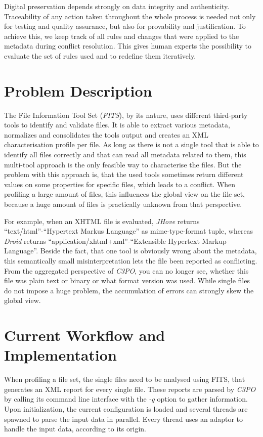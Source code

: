 \documentclass[a4paper,12pt]{article}
\begin{document}
Digital preservation depends strongly on data integrity and authenticity. Traceability of any action taken throughout the whole process is needed not only for testing and quality assurance, but also for provability and justification. To achieve this, we keep track of all rules and changes that were applied to the metadata during conflict resolution. This gives human experts the possibility to evaluate the set of rules used and to redefine them iteratively.

\clearpage

\section{Problem Description}

The File Information Tool Set (\emph{FITS}), by its nature, uses different third-party tools to identify and validate files. It is able to extract various metadata, normalizes and consolidates the tools output and creates an XML characterisation profile per file. As long as there is not a single tool that is able to identify all files correctly and that can read all metadata related to them, this multi-tool approach is the only feasible way to characterise the files. But the problem with this approach is, that the used tools sometimes return different values on some properties for specific files, which leads to a conflict. When profiling a large amount of files, this influences the global view on the file set, because a huge amount of files is practically unknown from that perspective.

For example, when an XHTML file is evaluated, \emph{JHove} returns ``text/html''-``Hypertext Markus Language'' as mime-type-format tuple, whereas \emph{Droid} returns ``application/xhtml+xml''-``Extensible Hypertext Markup Language''. Beside the fact, that one tool is obviously wrong about the metadata, this semantically small misinterpretation lets the file been reported as conflicting. From the aggregated perspective of \emph{C3PO}, you can no longer see, whether this file was plain text or binary or what format version was used. While single files do not impose a huge problem, the accumulation of errors can strongly skew the global view.


\section{Current Workflow and Implementation}
When profiling a file set, the single files need to be analysed using FITS, that generates an XML report for every single file. These reports are parsed by \emph{C3PO} by calling its command line interface with the \emph{-g} option to gather information. Upon initialization, the current configuration is loaded and several threads are spawned to parse the input data in parallel. Every thread uses an adaptor to handle the input data, according to its origin.
\end{document}
